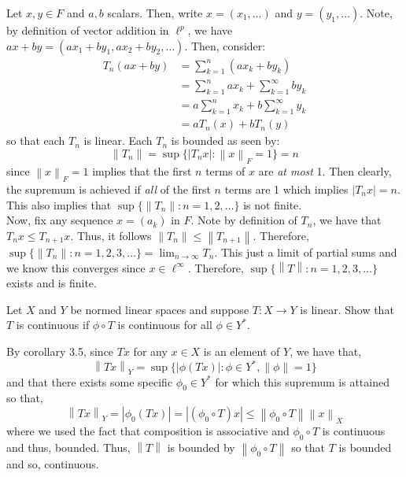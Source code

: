 \documentclass{article}
\newcommand{\norm}[1]{\left\lVert#1\right\rVert}
\begin{document}
    \begin{Answer}
        Let $x,y\in F$ and $a,b$ scalars. Then, write $x = (x_1,\hdots)$ and $y = (y_1,\hdots)$. Note, by definition of vector addition in
        $\ell^p$, we have $ax + by = (ax_1 + by_1,ax_2+by_2,\hdots)$. Then, consider:
        \begin{align*}
            T_n(ax+by) &= \sum_{k=1}^{n}  (ax_k+by_k) \\
                &= \sum_{k=1}^{n} ax_k + \sum_{k=1}^{\infty} by_k \\
                &= a\sum_{k=1}^{n} x_k + b\sum_{k=1}^{\infty} y_k \\
                &= aT_n(x) + bT_n(y)
        \end{align*}
        so that each $T_n$ is linear. Each $T_n$ is bounded as seen by:
        \[ \norm{T_n} = \sup\{|T_nx|: \norm{x}_{F}=1\} = n \]
        since $\norm{x}_F = 1$ implies that the first $n$ terms of $x$ are \textit{at most} 1. Then clearly, the supremum is achieved if
        \textit{all} of the first $n$ terms are 1 which implies $|T_nx| = n$. This also implies that $\sup\{\norm{T_n}:n=1,2,\hdots\}$ is
        not finite.\\

        Now, fix any sequence $x = (a_k)$ in $F$. Note by definition of $T_n$, we have that $T_nx \leq T_{n+1}x$. Thus, it follows
        $\norm{T_n}\leq \norm{T_{n+1}}$. Therefore, $\sup\{\norm{T_n}:n=1,2,3,\hdots\}=\lim_{n\to\infty} T_n$. This just a limit of partial
        sums and we know this converges since $x\in\ell^{\infty}$. Therefore, $\sup\{\norm{T}:n=1,2,3,\hdots\}$ exists and is finite.
    \end{Answer}

    \begin{Exercise}
        Let $X$ and $Y$ be normed linear spaces and suppose $T:X\to Y$ is linear. Show that $T$ is continuous if $\phi\circ T$ is continuous
        for all $\phi\in Y^*$.
    \end{Exercise}
    \begin{Answer}
        By corollary 3.5, since $Tx$ for any $x\in X$ is an element of $Y$, we have that,
        \[ \norm{Tx}_Y = \sup\{|\phi(Tx)|: \phi\in Y^*,\norm{\phi}=1\} \]
        and that there exists some specific $\phi_0\in Y^*$ for which this supremum is attained so that,
        \[ \norm{Tx}_Y = |\phi_0(Tx)| = |(\phi_0 \circ T)x| \leq \norm{\phi_0\circ T}\norm{x}_X \]
        where we used the fact that composition is associative and $\phi_0\circ T$ is continuous and thus, bounded. Thus, $\norm{T}$
        is bounded by $\norm{\phi_0\circ T}$ so that $T$ is bounded and so, continuous.
    \end{Answer}
\end{document}
